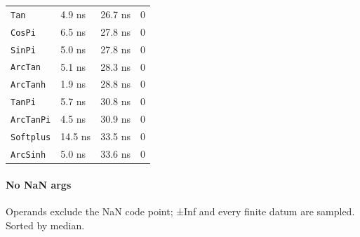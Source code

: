 \begin{table}[h]
\begin{tabulary}{\linewidth}{L L L L}
\texttt{Tan} & 4.9 ns & 26.7 ns & 0 \\
\texttt{CosPi} & 6.5 ns & 27.8 ns & 0 \\
\texttt{SinPi} & 5.0 ns & 27.8 ns & 0 \\
\texttt{ArcTan} & 5.1 ns & 28.3 ns & 0 \\
\texttt{ArcTanh} & 1.9 ns & 28.8 ns & 0 \\
\texttt{TanPi} & 5.7 ns & 30.8 ns & 0 \\
\texttt{ArcTanPi} & 4.5 ns & 30.9 ns & 0 \\
\texttt{Softplus} & 14.5 ns & 33.5 ns & 0 \\
\texttt{ArcSinh} & 5.0 ns & 33.6 ns & 0 \\
\bottomrule
\end{tabulary}

\end{table}



\paragraph{No NaN args}\indent



\label{11020842090045916616}{}


Operands exclude the NaN code point; ±Inf and every finite datum are sampled. Sorted by median.




